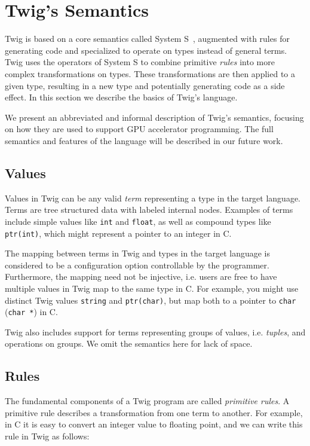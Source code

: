 
\section{Twig's Semantics}
\label{semantics}

Twig is based on a core semantics called System S~\cite{system-s}, augmented with rules for generating code and specialized to operate on types instead of general terms. Twig uses the operators of System S to combine primitive \emph{rules} into more complex transformations on types. These transformations are then applied to a given type, resulting in a new type and potentially generating code as a side effect. In this section we describe the basics of Twig's language.

We present an abbreviated and informal description of Twig's semantics, focusing on how they are used to support GPU accelerator programming. The full semantics and features of the language will be described in our future work.

\subsection{Values}

Values in Twig can be any valid \emph{term} representing a type in the target language. Terms are tree structured data with labeled internal nodes. Examples of terms include simple values like \texttt{int} and \texttt{float}, as well as compound types like \texttt{ptr(int)}, which might represent a pointer to an integer in C.

The mapping between terms in Twig and types in the target language is considered to be a configuration option controllable by the programmer. Furthermore, the mapping need not be injective, i.e. users are free to have multiple values in Twig map to the same type in C. For example, you might use distinct Twig values \texttt{string} and \texttt{ptr(char)}, but map both to a pointer to \texttt{char} (\texttt{char *}) in C.

Twig also includes support for terms representing groups of values, i.e. \emph{tuples}, and operations on groups. We omit the semantics here for lack of space.

\subsection{Rules}
\label{sec:rules}

The fundamental components of a Twig program are called \emph{primitive rules}. A primitive rule describes a transformation from one term to another. For example, in C it is easy to convert an integer value to floating point, and we can write this rule in Twig as follows:

